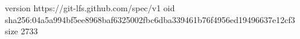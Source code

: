 version https://git-lfs.github.com/spec/v1
oid sha256:04a5a994bf5ee8968baf6325002fbc6dba339461b76f4956ed19496637e12cf3
size 2733
